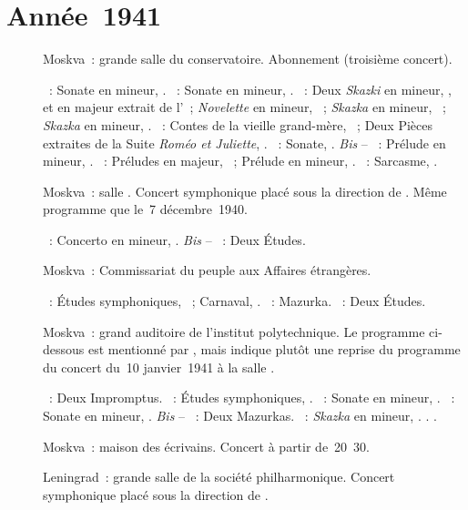 \section{Année~1941}

\begin{description}
 \item[]
 Moskva~: grande salle du conservatoire.
 Abonnement  (troisième concert).

 \textsc{\Beethoven{}}~: Sonate en \kC \Sharp mineur,  .
 \textsc{\Chopin{}}~: Sonate en \kB \Flat mineur, .
 \textsc{\Medtner{}}~: Deux \emph{Skazki} en \kF mineur, 
 , et en \kE \Flat majeur extrait de l'~;
 \emph{Novelette} en \kC mineur,  ~; \emph{Skazka} en \kE
 mineur,  ~; \emph{Skazka} en \kB mineur, 
 .
 \textsc{\Prokofiev{}}~: Contes de la vieille grand-mère, ~; Deux
 Pièces extraites de la Suite \emph{Roméo et Juliette}, .
 \textsc{\Scriabine{}}~: Sonate, .
 \emph{Bis} -- \textsc{\Scriabine{}}~: Prélude en \kG mineur, 
 .
 \textsc{\Rachmaninov{}}~: Préludes en \kG majeur,  ~;
 Prélude en \kG \Sharp mineur,  .
 \textsc{\Prokofiev{}}~: Sarcasme,  .
 \item[]
 Moskva~: salle \Tchaikovski{}.
 Concert symphonique placé sous la direction de \IMiklashevsky{}.
 Même programme que le~7 décembre~1940.

 \textsc{\Scriabine{}}~: Concerto en \kF \Sharp mineur, .
 \emph{Bis} -- \textsc{\Scriabine{}}~: Deux Études.
 \item[]
 Moskva~: Commissariat du peuple aux Affaires étrangères.

 \textsc{\Schumann{}}~: Études symphoniques, ~; Carnaval, .
 \textsc{\Chopin{}}~: Mazurka.
 \textsc{\Scriabine{}}~: Deux Études.
 \item[]
 Moskva~: grand auditoire de l'institut polytechnique.
 Le programme ci-dessous est mentionné par \citet[p.~417]{Scriabine}, mais
 \citet[p.~163]{Nekrasova08} indique plutôt une reprise du programme du
 concert du~10 janvier~1941 à la salle \Tchaikovski{}.

 \textsc{\Schubert{}}~: Deux Impromptus.
 \textsc{\Schumann{}}~: Études symphoniques, .
 \textsc{\Beethoven{}}~: Sonate en \kC \Sharp mineur,  .
 \textsc{\Chopin{}}~: Sonate en \kB \Flat mineur, .
 \emph{Bis} -- \textsc{\Chopin{}}~: Deux Mazurkas.
 \textsc{\Medtner{}}~: \emph{Skazka} en \kF mineur,  .
 \textsc{\Scriabine{}}.
 \textsc{\Schumann{}}.
 \item[]
 Moskva~: maison des écrivains.
 Concert à partir de~20~30.
 \item[]
 Leningrad~: grande salle de la société philharmonique.
 Concert symphonique placé sous la direction de \IMiklashevsky{}.


\end{description}
